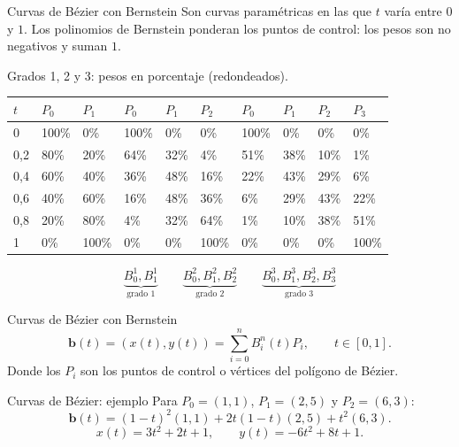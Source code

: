 \documentclass[original_version/main.tex]{subfiles}
\begin{document}
\begin{frame}[t]{Curvas de Bézier con Bernstein}
\small Son curvas paramétricas en las que $t$ varía entre $0$ y $1$. Los polinomios de Bernstein ponderan los puntos de control: los pesos son no negativos y suman $1$.\par\medskip\scriptsize Grados 1, 2 y 3: pesos en porcentaje (redondeados).\begingroup\scriptsize\setlength{\tabcolsep}{2pt}\begin{center}\begin{tabular}{|C{.082\textwidth}|C{.082\textwidth}|C{.082\textwidth}|C{.082\textwidth}|C{.082\textwidth}|C{.082\textwidth}|C{.082\textwidth}|C{.082\textwidth}|C{.082\textwidth}|C{.082\textwidth}|}\hline
$t$ & $P_0$ & $P_1$ & $P_0$ & $P_1$ & $P_2$ & $P_0$ & $P_1$ & $P_2$ & $P_3$\\\hline
\rule[-1.5mm]{0pt}{5mm}0 & 100\% & 0\% & 100\% & 0\% & 0\% & 100\% & 0\% & 0\% & 0\%\\\hline
\rule[-1.5mm]{0pt}{5mm}0,2 & 80\% & 20\% & 64\% & 32\% & 4\% & 51\% & 38\% & 10\% & 1\%\\\hline
\rule[-1.5mm]{0pt}{5mm}0,4 & 60\% & 40\% & 36\% & 48\% & 16\% & 22\% & 43\% & 29\% & 6\%\\\hline
\rule[-1.5mm]{0pt}{5mm}0,6 & 40\% & 60\% & 16\% & 48\% & 36\% & 6\% & 29\% & 43\% & 22\%\\\hline
\rule[-1.5mm]{0pt}{5mm}0,8 & 20\% & 80\% & 4\% & 32\% & 64\% & 1\% & 10\% & 38\% & 51\%\\\hline
\rule[-1.5mm]{0pt}{5mm}1 & 0\% & 100\% & 0\% & 0\% & 100\% & 0\% & 0\% & 0\% & 100\%\\\hline
\end{tabular}\end{center}\endgroup\[\underbrace{B_0^1,B_1^1}_{\text{grado 1}}\qquad\underbrace{B_0^2,B_1^2,B_2^2}_{\text{grado 2}}\qquad\underbrace{B_0^3,B_1^3,B_2^3,B_3^3}_{\text{grado 3}}\]
\end{frame}

\begin{frame}[t]{Curvas de Bézier con Bernstein}
\vspace{8mm}\[\boxed{\mathbf b(t)=(x(t),y(t))=\sum_{i=0}^{n}B_i^n(t)P_i},\qquad t\in[0,1].\]\bigskip Donde los $P_i$ son los puntos de control o vértices del polígono de Bézier.
\end{frame}

\begin{frame}[t]{Curvas de Bézier: ejemplo}
\small Para $P_0=(1,1)$, $P_1=(2,5)$ y $P_2=(6,3)$:\[\mathbf b(t)=(1-t)^2(1,1)+2t(1-t)(2,5)+t^2(6,3).\]\[x(t)=3t^2+2t+1,\qquad y(t)=-6t^2+8t+1.\]
\end{frame}
\end{document}
